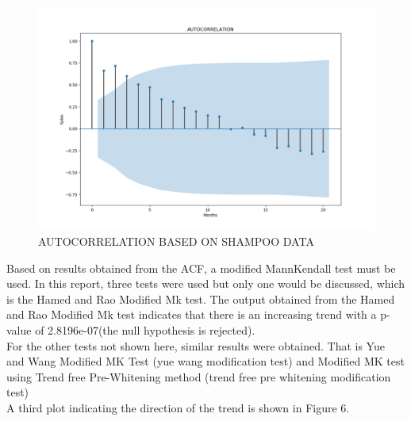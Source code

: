 \documentclass[12pt, letterpaper, twoside]{article}
\begin{document}
\begin{figure}[bp!]
	    \centering
		\includegraphics[width=1\textwidth]{SHAMPOO_DATA_ACF_PLOT.png}
		    \caption{AUTOCORRELATION BASED ON SHAMPOO DATA}
		        \label{fig:2.2}
\end{figure}
Based on results obtained from the ACF, a modified MannKendall test must be used. In this report, three tests were used but only one would be discussed, which is the Hamed and Rao Modified Mk test. 
The output obtained from the Hamed and Rao Modified Mk test indicates that there is an increasing trend with a p-value of 2.8196e-07(the null hypothesis is rejected).\\ For the other tests not shown here, similar results were obtained. That is Yue and Wang Modified MK Test (yue wang modification test) and Modified MK test using Trend free Pre-Whitening method (trend free pre whitening modification test)\\A third plot indicating the direction of the trend is shown in Figure 6.\\
\end{document}
